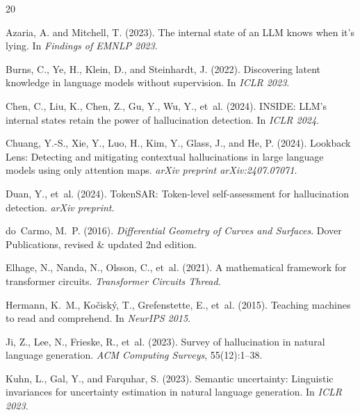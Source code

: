 \documentclass[10pt]{article}
\begin{document}
\begin{thebibliography}{20}

Azaria, A. and Mitchell, T. (2023).
\newblock The internal state of an LLM knows when it's lying.
\newblock In \textit{Findings of EMNLP 2023}.

Burns, C., Ye, H., Klein, D., and Steinhardt, J. (2022).
\newblock Discovering latent knowledge in language models without supervision.
\newblock In \textit{ICLR 2023}.

Chen, C., Liu, K., Chen, Z., Gu, Y., Wu, Y., et~al. (2024).
\newblock INSIDE: LLM's internal states retain the power of hallucination detection.
\newblock In \textit{ICLR 2024}.

Chuang, Y.-S., Xie, Y., Luo, H., Kim, Y., Glass, J., and He, P. (2024).
\newblock Lookback Lens: Detecting and mitigating contextual hallucinations in large language models using only attention maps.
\newblock \textit{arXiv preprint arXiv:2407.07071}.

Duan, Y., et~al. (2024).
\newblock TokenSAR: Token-level self-assessment for hallucination detection.
\newblock \textit{arXiv preprint}.

do~Carmo, M.~P. (2016).
\newblock \textit{Differential Geometry of Curves and Surfaces}.
\newblock Dover Publications, revised \& updated 2nd edition.

Elhage, N., Nanda, N., Olsson, C., et~al. (2021).
\newblock A mathematical framework for transformer circuits.
\newblock \textit{Transformer Circuits Thread}.

Hermann, K.~M., Ko\v{c}isk\'{y}, T., Grefenstette, E., et~al. (2015).
\newblock Teaching machines to read and comprehend.
\newblock In \textit{NeurIPS 2015}.

Ji, Z., Lee, N., Frieske, R., et~al. (2023).
\newblock Survey of hallucination in natural language generation.
\newblock \textit{ACM Computing Surveys}, 55(12):1--38.

Kuhn, L., Gal, Y., and Farquhar, S. (2023).
\newblock Semantic uncertainty: Linguistic invariances for uncertainty estimation in natural language generation.
\newblock In \textit{ICLR 2023}.


\end{thebibliography}
\end{document}
